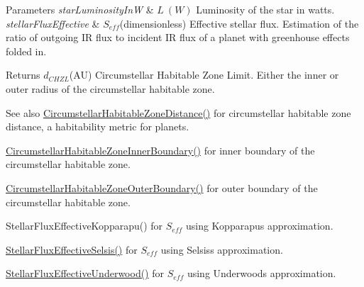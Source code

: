 \begin{DoxyParams}{Parameters}
{\em star\+Luminosity\+InW} & $L\ (W)$ Luminosity of the star in watts. \\
\hline
{\em stellar\+Flux\+Effective} & $S_{eff}$(dimensionless) Effective stellar flux. Estimation of the ratio of outgoing IR flux to incident IR flux of a planet with greenhouse effects folded in. \\
\hline
\end{DoxyParams}
\begin{DoxyReturn}{Returns}
$d_{CHZL}$(AU) Circumstellar Habitable Zone Limit. Either the inner or outer radius of the circumstellar habitable zone. 
\end{DoxyReturn}
\begin{DoxySeeAlso}{See also}
\mbox{\hyperlink{group___e_g_x_phys-_circumstellar_habitable_zone_limit_ga3247e5fe14db39121ce622207af172fd}{Circumstellar\+Habitable\+Zone\+Distance()}} for circumstellar habitable zone distance, a habitability metric for planets. 

\mbox{\hyperlink{group___e_g_x_phys-_circumstellar_habitable_zone_limit_gab31a33d0dbd3ecd00537832b5b836d73}{Circumstellar\+Habitable\+Zone\+Inner\+Boundary()}} for inner boundary of the circumstellar habitable zone. 

\mbox{\hyperlink{group___e_g_x_phys-_circumstellar_habitable_zone_limit_ga3a6dbbdaddddd071cb1f0a20e40d83bd}{Circumstellar\+Habitable\+Zone\+Outer\+Boundary()}} for outer boundary of the circumstellar habitable zone. 

Stellar\+Flux\+Effective\+Kopparapu() for $S_{eff}$ using Kopparapu\textquotesingle{}s approximation. 

\mbox{\hyperlink{group___e_g_x_phys-_circumstellar_habitable_zone_limit_ga0eb1003b4cfcbcafde635cefca5ae5c2}{Stellar\+Flux\+Effective\+Selsis()}} for $S_{eff}$ using Selsis\textquotesingle{}s approximation. 

\mbox{\hyperlink{group___e_g_x_phys-_circumstellar_habitable_zone_limit_gafe02cffcc63c39794feb6f1de5e7a9bb}{Stellar\+Flux\+Effective\+Underwood()}} for $S_{eff}$ using Underwood\textquotesingle{}s approximation. 
\end{DoxySeeAlso}
\mbox{\label{group___e_g_x_phys-_circumstellar_habitable_zone_limit_ga3a6dbbdaddddd071cb1f0a20e40d83bd}} 
